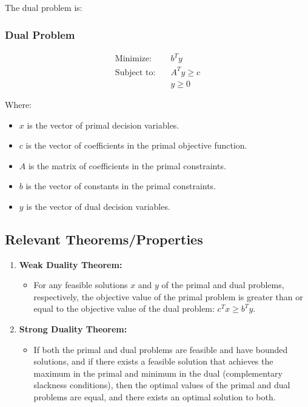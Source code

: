 \documentclass[a4paper]{article}
\begin{document}
The dual problem is:

\subsubsection{Dual Problem}
\begin{align*}
\text{Minimize:} \quad & b^Ty \\
\text{Subject to:} \quad & A^Ty \geq c \\
& y \geq 0
\end{align*}

Where:
\begin{itemize}
    \item $x$ is the vector of primal decision variables.
    \item $c$ is the vector of coefficients in the primal objective function.
    \item $A$ is the matrix of coefficients in the primal constraints.
    \item $b$ is the vector of constants in the primal constraints.
    \item $y$ is the vector of dual decision variables.
\end{itemize}

\subsection{Relevant Theorems/Properties}

\begin{enumerate}
    \item \textbf{Weak Duality Theorem:}
    \begin{itemize}
        \item For any feasible solutions $x$ and $y$ of the primal and dual problems, respectively, the objective value of the primal problem is greater than or equal to the objective value of the dual problem: $c^Tx \geq b^Ty$.
    \end{itemize}
    
    \item \textbf{Strong Duality Theorem:}
    \begin{itemize}
        \item If both the primal and dual problems are feasible and have bounded solutions, and if there exists a feasible solution that achieves the maximum in the primal and minimum in the dual (complementary slackness conditions), then the optimal values of the primal and dual problems are equal, and there exists an optimal solution to both.
    \end{itemize}
\end{enumerate}
\end{document}
